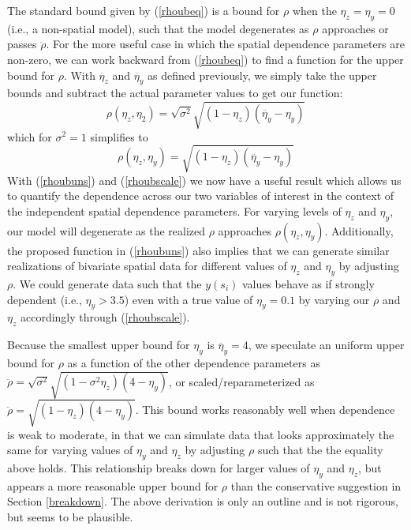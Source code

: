 \documentclass[12pt, a4paper, twoside]{article}
\begin{document}
The standard bound given by (\ref{rhoubeq}) is a bound for $\rho$ when the $\eta_z=\eta_y=0$ (i.e., a non-spatial model), such that the model degenerates as $\rho$ approaches or passes $\ddot{\rho}$. For the more useful case in which the spatial dependence parameters are non-zero, we can work backward from (\ref{rhoubeq}) to find a function for the upper bound for $\rho$. With $\ddot{\eta_z}$ and $\ddot{\eta_y}$ as defined previously, we simply take the upper bounds and subtract the actual parameter values to get our function:
\begin{equation}
\label{rhoubuns}
\rho\left(\eta_z,\eta_2\right) =\sqrt{\sigma^2}\sqrt{(1-\eta_z)(\ddot{\eta_y}-\eta_y)} 
\end{equation}
which for $\sigma^2=1$ simplifies to
\begin{equation}
\label{rhoubscale}
\rho\left(\eta_z,\eta_y\right) =\sqrt{(1-\eta_z)(\ddot{\eta_y}-\eta_y)} 
\end{equation}
With (\ref{rhoubuns}) and (\ref{rhoubscale}) we now have a useful result which allows us to quantify the dependence across our two variables of interest in the context of the independent spatial dependence parameters. For varying levels of $\eta_z$ and $\eta_y$, our model will degenerate as the realized $\rho$ approaches $\rho(\eta_z, \eta_y)$. Additionally, the proposed function in (\ref{rhoubuns}) also implies that we can generate similar realizations of bivariate spatial data for different values of $\eta_z$ and $\eta_y$ by adjusting $\rho$. We could generate data such that the $y(s_i)$ values behave as if strongly dependent (i.e., $\eta_y>3.5$) even with a true value of $\eta_y = 0.1$ by varying our $\rho$ and $\eta_z$ accordingly through (\ref{rhoubscale}).

Because the smallest upper bound for $\eta_y$ is $\ddot{\eta_y}=4$, we speculate an uniform upper bound for $\rho$ as a function of the other dependence parameters as $\ddot{\rho} =\sqrt{\sigma^2}\sqrt{(1-\sigma^2\eta_z)(4-\eta_y)}$, or scaled/reparameterized as $\ddot{\rho} =\sqrt{(1-\eta_z)(4-\eta_y)}$. This bound works reasonably well when dependence is weak to moderate, in that we can simulate data that looks approximately the same for varying values of $\eta_y$ and $\eta_z$ by adjusting $\rho$ such that the the equality above holds. This relationship breaks down for larger values of $\eta_y$ and $\eta_z$, but appears a more reasonable upper bound for $\rho$ than the conservative suggestion in Section \ref{breakdown}. The above derivation is only an outline and is not rigorous, but seems to be plausible.
\end{document}
